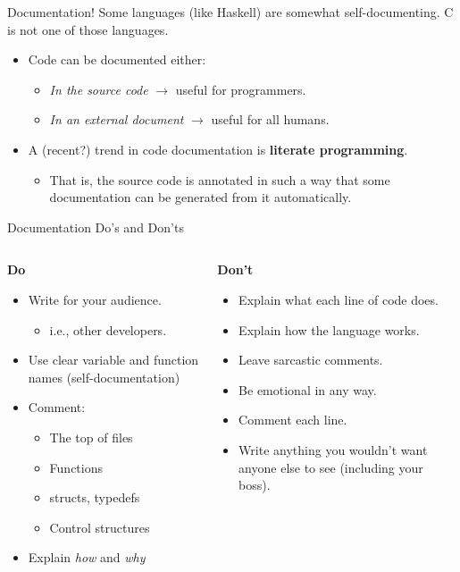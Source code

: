 \documentclass[11pt]{beamer}
\begin{document}
\begin{frame}[fragile=singleslide]{Documentation!}
Some languages (like Haskell) are somewhat self-documenting.  C is not one of those languages.
\begin{itemize}
\item Code can be documented either:
\begin{itemize}
\item \emph{In the source code} $\rightarrow$ useful for programmers.
\item \emph{In an external document} $\rightarrow$ useful for all humans.  
\end{itemize}
\item A (recent?) trend in code documentation is \textbf{literate programming}.
\begin{itemize}
\item That is, the source code is annotated in such a way that some  documentation can be generated from it automatically.  
\end{itemize}
\end{itemize}
\end{frame}

\begin{frame}{Documentation Do's and Don'ts}
\begin{columns}
\begin{column}{0.5\textwidth}
\center
{\large \textbf{Do}}
\flushleft
\begin{itemize}
\item Write for your audience.
\begin{itemize}
\item i.e., other developers.
\end{itemize}
\item Use clear variable and function names (self-documentation)
\item Comment:
\begin{itemize}
\item The top of files
\item Functions
\item structs, typedefs
\item Control structures
\end{itemize}
\item Explain \emph{how} and \emph{why}
\end{itemize}
\end{column}
\begin{column}{0.5\textwidth}
\center
{\large \textbf{Don't}}
\flushleft
\begin{itemize}
\item Explain what each line of code does.
\item Explain how the language works.
\item Leave sarcastic comments. 
\item Be emotional in any way.
\item Comment each line. 
\item Write anything you wouldn't want anyone else to see (including your boss).
\end{itemize}
\end{column}
\end{columns}
\end{frame}
\end{document}
